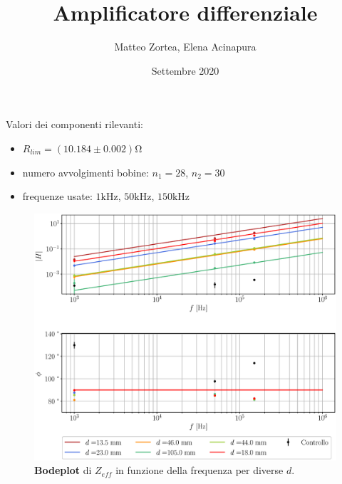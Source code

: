 \documentclass{article}
\title{Amplificatore differenziale}
\date{Settembre 2020}
\author{Matteo Zortea, Elena Acinapura}
\begin{document}
\maketitle
Valori dei componenti rilevanti:
\begin{itemize}
    \item $R_{lim} = (10.184\pm0.002) \si{\ohm}$
    \item numero avvolgimenti bobine: $n_1 = 28$, $n_2 = 30$
    \item frequenze usate: $1\si{\kilo\hertz}$, $50\si{\kilo\hertz}$, $150\si{\kilo\hertz}$
\end{itemize}

\begin{figure}[h!]
    \centering
    \includegraphics[scale = 0.55]{Grafici/bode.eps}
    \caption{\textbf{Bodeplot} di $Z_{eff}$ in funzione della frequenza per diverse $d$.}
    \label{fig:bode}
\end{figure}
\end{document}
